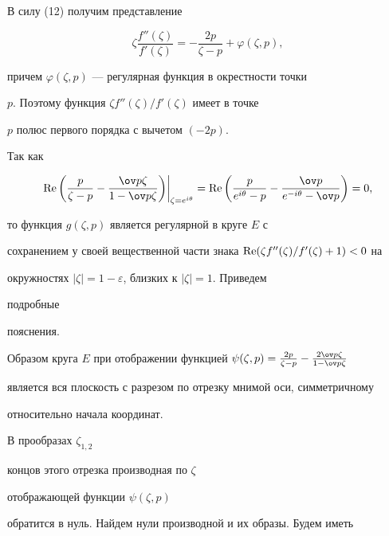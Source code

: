 \begin{pf} 


В силу (12) получим представление 


$$ 


\zeta\frac{f''(\zeta)}{f'(\zeta)}= 


-\frac{2p}{\zeta-p}+\varphi(\zeta,p), 


$$ 


причем $\varphi(\zeta,p)$ --- регулярная функция в окрестности точки 


$p$. Поэтому функция $\zeta f''(\zeta)/f'(\zeta)$ имеет в точке 


$p$ полюс первого порядка с вычетом $(-2p)$. 


 


Так как  


$$ 


\re\bigg(\frac{p}{\zeta-p}-\frac{\ov p\zeta}{1-\ov p\zeta} 


\bigg)\bigg|_{\zeta=e^{i\theta}}=\re\bigg( 


\frac{p}{e^{i\theta}-p}-\frac{\ov p}{e^{-i\theta}-\ov p} 


\bigg)=0, 


$$ 


то функция $g(\zeta,p)$ является регулярной в круге $E$ с 


сохранением у своей вещественной части знака $\re(\zeta 


f''(\zeta)/f'(\zeta)+1)<0$ на 


окружностях $|\zeta|=1-\varepsilon$, близких к $|\zeta|=1$. Приведем 


подробные 


пояснения. 


 


Образом круга $E$ при отображении функцией $\psi(\zeta,p)= 


\frac{2p}{\zeta-p}- \frac{2\ov p\zeta}{1-\ov p\zeta}$ 


является вся плоскость с разрезом по отрезку мнимой оси, симметричному 


относительно начала координат. 


В прообразах $\zeta_{1,2}$ 


концов этого отрезка производная по $\zeta$ 


отображающей функции $\psi(\zeta,p)$ 


обратится в нуль. Найдем нули производной и их образы. Будем иметь 



\end{pf}
